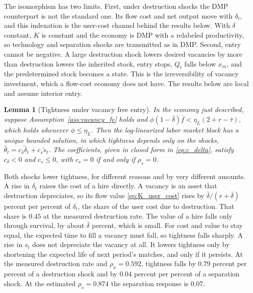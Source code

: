 \documentclass[authoryear, review, 12pt]{elsarticle}
\newtheorem{lemma}{Lemma}
\begin{document}
The isomorphism has two limits. First, under destruction shocks the DMP counterpart is
not the standard one. Its flow cost and net output move with $\delta_t$, and this
indexation is the user-cost channel behind the results below. With $\delta$ constant, $K$
is constant and the economy is DMP with a relabeled productivity, so technology and
separation shocks are transmitted as in DMP. Second, entry cannot be negative. A large
destruction shock lowers desired vacancies by more than destruction lowers the inherited
stock, entry stops, $Q_t$ falls below $x_m$, and the predetermined stock becomes a state.
This is the irreversibility of vacancy investment, which a flow-cost economy does not have.
The results below are local and assume interior entry.

\begin{lemma}[Tightness under vacancy free entry]\label{lem:theta}
In the economy just described, suppose Assumption~\ref{ass:vacancy_fe} holds and
$\phi(1-\bar\delta)\bar{f}<\eta_L(2+r-\bar\tau)$, which holds whenever $\phi\leq\eta_L$. Then the log-linearized labor market block has a unique
bounded solution, in which tightness depends only on the shocks,
$\hat\theta_t=c_\delta\tilde\delta_t+c_s\tilde{s}_t$. The coefficients, given in closed form
in \eqref{eq:c_delta}, satisfy $c_\delta<0$ and $c_s\leq0$, with $c_s=0$ if and only if
$\rho_s=0$.
\end{lemma}

Both shocks lower tightness, for different reasons and by very different amounts. A rise in
$\delta_t$ raises the cost of a hire directly. A vacancy is an asset that destruction
depreciates, so its flow value \eqref{eq:K_user_cost} rises by $\bar\delta/(r+\bar\delta)$
percent per percent of $\delta_t$, the share of the user cost due to destruction. That share
is $0.45$ at the measured destruction rate. The value of a hire falls only through survival,
by about $\bar\delta$ percent, which is small. For cost and value to stay equal, the expected
time to fill a vacancy must fall, so tightness falls sharply. A rise in $s_t$ does not
depreciate the vacancy at all. It lowers tightness only by shortening the expected life of
next period's matches, and only if it persists. At the measured destruction rate and
$\rho_x=0.592$, tightness falls by $0.79$ percent per percent of a destruction shock and by
$0.04$ percent per percent of a separation shock. At the estimated $\rho_s=0.874$ the
separation response is $0.07$.
\end{document}
